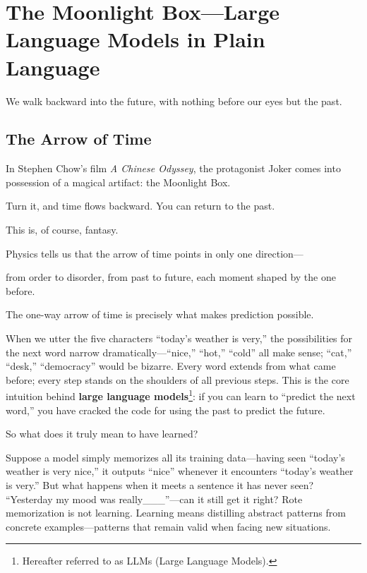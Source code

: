 \chapter{The Moonlight Box---Large Language Models in Plain Language}

\begin{myquote}
We walk backward into the future, with nothing before our eyes but the past.
\end{myquote}


\section{The Arrow of Time}

In Stephen Chow's film \textit{A Chinese Odyssey}, the protagonist Joker comes into possession of a magical artifact: the Moonlight Box.

Turn it, and time flows backward. You can return to the past.

\vspace{1em}

This is, of course, fantasy.

Physics tells us that the arrow of time points in only one direction---

from order to disorder, from past to future, each moment shaped by the one before.

The one-way arrow of time is precisely what makes prediction possible.

\vspace{1em}

When we utter the five characters ``today's weather is very,'' the possibilities for the next word narrow dramatically---``nice,'' ``hot,'' ``cold'' all make sense; ``cat,'' ``desk,'' ``democracy'' would be bizarre. Every word extends from what came before; every step stands on the shoulders of all previous steps.
This is the core intuition behind \textbf{large language models}\footnote{Hereafter referred to as LLMs (Large Language Models).}: if you can learn to ``predict the next word,'' you have cracked the code for using the past to predict the future.

\vspace{1em}

So what does it truly mean to have learned?

Suppose a model simply memorizes all its training data---having seen ``today's weather is very nice,'' it outputs ``nice'' whenever it encounters ``today's weather is very.'' But what happens when it meets a sentence it has never seen? ``Yesterday my mood was really\_\_\_''---can it still get it right? Rote memorization is not learning. Learning means distilling abstract patterns from concrete examples---patterns that remain valid when facing new situations.

